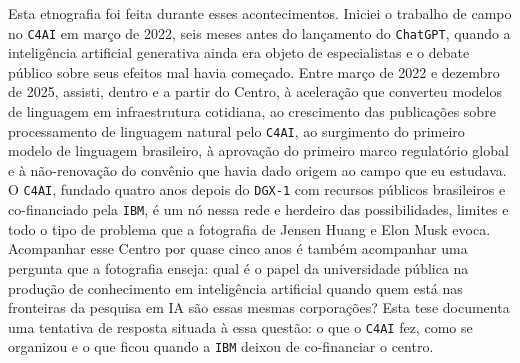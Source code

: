 Esta etnografia foi feita durante esses acontecimentos. Iniciei o trabalho de campo no \texttt{C4AI} em março de 2022, seis meses antes do lançamento do \texttt{ChatGPT}, quando a inteligência artificial generativa ainda era objeto de especialistas e o debate público sobre seus efeitos mal havia começado. Entre março de 2022 e dezembro de 2025, assisti, dentro e a partir do Centro, à aceleração que converteu modelos de linguagem em infraestrutura cotidiana, ao crescimento das publicações sobre processamento de linguagem natural pelo \texttt{C4AI}, ao surgimento do primeiro modelo de linguagem brasileiro, à aprovação do primeiro marco regulatório global e à não-renovação do convênio que havia dado origem ao campo que eu estudava. O \texttt{C4AI}, fundado quatro anos depois do \texttt{DGX-1} com recursos públicos brasileiros e co-financiado pela \texttt{IBM}, é um nó nessa rede e herdeiro das possibilidades, limites e todo o tipo de problema que a fotografia de Jensen Huang e Elon Musk evoca. Acompanhar esse Centro por quase cinco anos é também acompanhar uma pergunta que a fotografia enseja: qual é o papel da universidade pública na produção de conhecimento em inteligência artificial quando quem está nas fronteiras da pesquisa em IA são essas mesmas corporações? Esta tese documenta uma tentativa de resposta situada à essa questão: o que o \texttt{C4AI} fez, como se organizou e o que ficou quando a \texttt{IBM} deixou de co-financiar o centro. 

